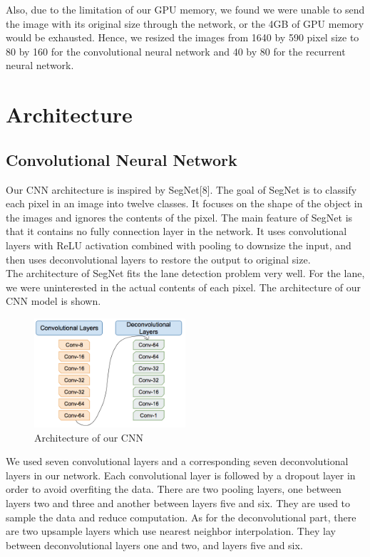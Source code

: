 \documentclass[runningheads]{llncs}
\begin{document}
Also, due to the limitation of our GPU memory, we found we were unable to send the image with its original size through the network, or the 4GB of GPU memory would be exhausted. Hence, we resized the images from 1640 by 590 pixel size to 80 by 160 for the convolutional neural network and 40 by 80 for the recurrent neural network.

\section{Architecture}
\subsection{Convolutional Neural Network}
Our CNN architecture is inspired by SegNet[8]. The goal of SegNet is to classify each pixel in an image into twelve classes. It focuses on the shape of the object in the images and ignores the contents of the pixel. The main feature of SegNet is that it contains no fully connection layer in the network. It uses convolutional layers with ReLU activation combined with pooling to downsize the input, and then uses deconvolutional layers to restore the output to original size. \\

The architecture of SegNet fits the lane detection problem very well. For the lane, we were uninterested in the actual contents of each pixel. The architecture of our CNN model is shown.

\begin{figure}[h]
\centering
\includegraphics[width=0.5\textwidth]{Figure3}
\caption{Architecture of our CNN} \label{fig3}
\end{figure}

We used seven convolutional layers and a corresponding seven deconvolutional layers in our network. Each convolutional layer is followed by a dropout layer in order to avoid overfiting the data. There are two pooling layers, one between layers two and three and another between layers five and six. They are used to sample the data and reduce computation. As for the deconvolutional part, there are two upsample layers which use nearest neighbor interpolation. They lay between deconvolutional layers one and two, and layers five and six. \\
\end{document}
